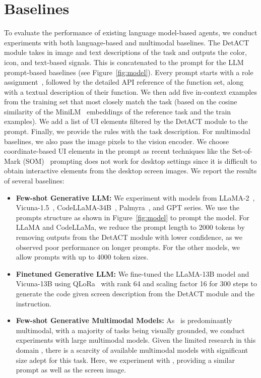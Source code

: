 \section{Baselines}

To evaluate the performance of existing language model-based agents, we conduct experiments with both language-based and multimodal baselines. The DetACT module takes in image and text descriptions of the task and outputs the color, icon, and text-based signals. This is concatenated to the prompt for the LLM prompt-based baselines (see Figure~\ref{fig:model}). Every prompt starts with a role assignment~\cite{zhao2023survey}, followed by the detailed API reference of the \textit{\pyautogui} function set, along with a textual description of their function. We then add five in-context examples from the training set that most closely match the task (based on the cosine similarity of the MiniLM~\cite{wang2020minilm} embeddings of the reference task and the train examples). We add a list of UI elements filtered by the DetACT module to the prompt. Finally, we provide the rules with the task description. For multimodal baselines, we also pass the image pixels to the vision encoder. We choose coordinate-based UI elements in the prompt as recent techniques like the Set-of-Mark (SOM)~\cite{yang2023setofmark} prompting does not work for desktop settings since it is difficult to obtain interactive elements from the desktop screen images. We report the results of several baselines:
\begin{itemize}
    \item \textbf{Few-shot Generative LLM:} 
    We experiment with models from LLaMA-2~\cite{touvron2023llama}, Vicuna-1.5~\cite{vicuna2023}, CodeLLaMA-34B~\cite{rozière2023code}, Palmyra~\cite{Palmyra}, and GPT \cite{openai2023gpt4} series. We use the prompts structure as shown in Figure~\ref{fig:model} to prompt the model. For LLaMA and CodeLLaMa, we reduce the prompt length to 2000 tokens by removing outputs from the DetACT module with lower confidence, as we observed poor performance on longer prompts. For the other models, we allow prompts with up to 4000 token sizes.
    
    \item \textbf{Finetuned Generative LLM:} 
    We fine-tuned the LLaMA-13B model and Vicuna-13B using QLoRa~\cite{dettmers2023qlora} with rank 64 and scaling factor 16 for 300 steps to generate the code given screen description from the DetACT module and the instruction.%

    \item \textbf{Few-shot Generative Multimodal Models:}
    As \ModelName\ is predominantly multimodal, with a majority of tasks being visually grounded, we conduct experiments with large multimodal models. Given the limited research in this domain \cite{mlm_survey, mlm_survey2}, there is a scarcity of available multimodal models with significant size adept for this task. Here, we experiment with \cite{liu2023llava, liu2023improvedllava}, providing a similar prompt as well as the screen image.%
\end{itemize}

